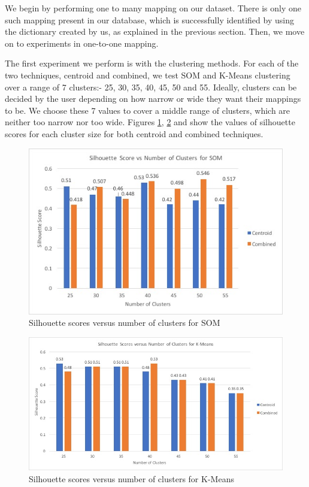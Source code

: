 \documentclass[conference]{IEEEtran}
\begin{document}
We begin by performing one to many mapping on our dataset. There is only one such mapping present in our database, which is successfully identified by using the dictionary created by us, as explained in the previous section. Then, we move on to experiments in one-to-one mapping.

The first experiment we perform is with the clustering methods. For each of the two techniques, centroid and combined, we test SOM and K-Means clustering over a range of 7 clusters:- 25, 30, 35, 40, 45, 50 and 55. Ideally, clusters can be decided by the user depending on how narrow or wide they want their mappings to be. We choose these 7 values to cover a middle range of clusters, which are neither too narrow nor too wide. Figures \ref{SOM_cluster}, \ref{KMeans_cluster} and show the values of silhouette scores for each cluster size for both centroid and combined techniques. 

\begin{figure}[h]
\centering
\includegraphics[scale=0.45]{som2.jpg}
\caption{Silhouette scores versus number of clusters for SOM}
\label{SOM_cluster}
\end{figure}

\begin{figure}[h]
\includegraphics[scale=0.35]{kmeans.jpg}
\caption{Silhouette scores versus number of clusters for K-Means}
\label{KMeans_cluster}
\end{figure}
\end{document}
